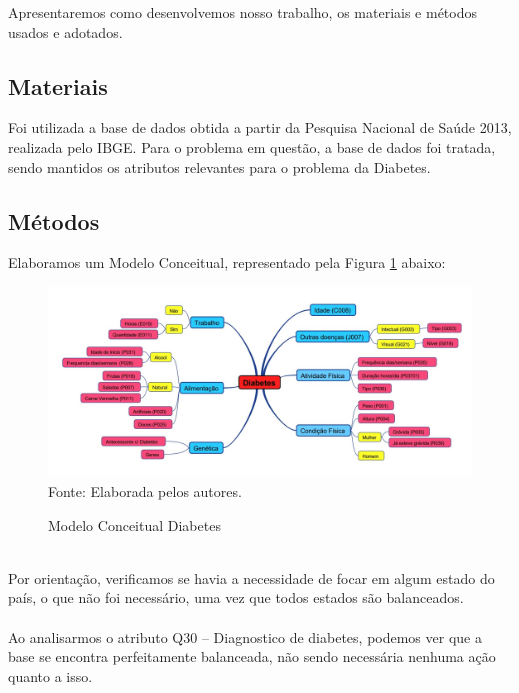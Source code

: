 \documentclass[12pt]{article}
\begin{document}
Apresentaremos como  desenvolvemos nosso trabalho, os materiais e métodos usados e adotados.

\subsection{Materiais}

Foi utilizada a base de dados obtida a partir da Pesquisa Nacional de Saúde 2013, realizada pelo IBGE. Para o problema em questão, a base de dados foi tratada, sendo mantidos os atributos relevantes para o problema da Diabetes.

\subsection{Métodos}

Elaboramos um Modelo Conceitual, representado pela Figura \ref{fig:diabetes_concept_map} abaixo:

\begin{figure}[h]
    \centering
    \caption{Modelo Conceitual Diabetes}
    \includegraphics[scale=0.38]{Diabetes_Concept_Map.jpg}\\
    {\footnotesize Fonte: Elaborada pelos autores.}
    \label{fig:diabetes_concept_map}
\end{figure}
\\
Por orientação, verificamos se havia a necessidade de focar em algum estado do país, o que não foi necessário, uma vez que todos estados são balanceados.\\\\
Ao analisarmos o atributo Q30 – Diagnostico de diabetes, podemos ver que a base se encontra perfeitamente balanceada, não sendo necessária nenhuma ação quanto a isso.\\
\end{document}
